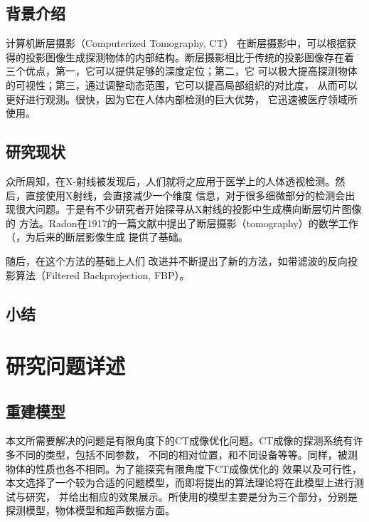 \section{背景介绍}
计算机断层摄影（Computerized Tomography, CT）
在断层摄影中，可以根据获得的投影图像生成探测物体的内部结构。断层摄影相比于传统的投影图像存在着
三个优点，第一，它可以提供足够的深度定位；第二，它
可以极大提高探测物体的可视性；第三，通过调整动态范围，它可以提高局部组织的对比度，
从而可以更好进行观测。很快，因为它在人体内部检测的巨大优势，
它迅速被医疗领域所使用\cite{dobbins2003digital}。


\section{研究现状}
众所周知，在X-射线被发现后，人们就将之应用于医学上的人体透视检测。然后，直接使用X射线，会直接减少一个维度
信息，对于很多细微部分的检测会出现很大问题。于是有不少研究者开始探寻从X射线的投影中生成横向断层切片图像的
方法。Radon在1917的一篇文献中提出了断层摄影（tomography）的数学工作（\cite{radon1986}，为后来的断层影像生成
提供了基础。

随后，在这个方法的基础上人们
改进并不断提出了新的方法，如带滤波的反向投影算法（Filtered Backprojection, FBP）\cite{kak1979computerized}。
\section{小结}



\chapter{研究问题详述}
\section{重建模型}
本文所需要解决的问题是有限角度下的CT成像优化问题。CT成像的探测系统有许多不同的类型，包括不同参数，
不同的相对位置，和不同设备等等。同样，被测物体的性质也各不相同。为了能探究有限角度下CT成像优化的
效果以及可行性，本文选择了一个较为合适的问题模型，而即将提出的算法理论将在此模型上进行测试与研究，
并给出相应的效果展示。所使用的模型主要是分为三个部分，分别是探测模型，物体模型和超声数据方面。
